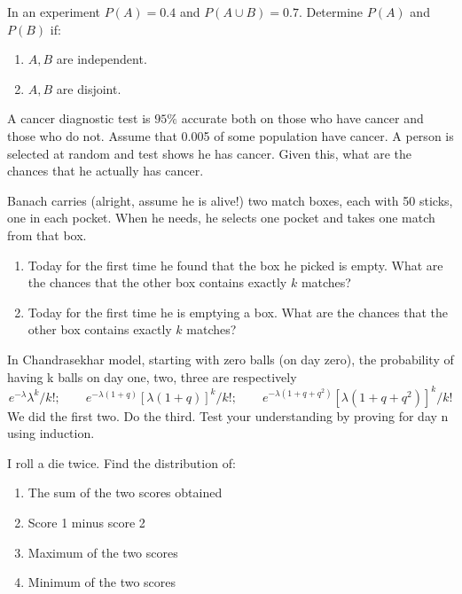 \documentclass[12pt]{article}
\newenvironment{question}[2][Question]{\begin{trivlist}
\item[\hskip \labelsep {\bfseries #1}\hskip \labelsep {\bfseries #2.}]}{\end{trivlist}}
\begin{document}
\begin{question}{16}
In an experiment $P(A) = 0.4$ and $P(A \cup B) = 0.7$. Determine $P(A)$ and $P(B)$ if:
\begin{enumerate}
\item $A, B$ are independent.
\item $A, B$ are disjoint.
\end{enumerate}
\end{question}

\begin{question}{17}
A cancer diagnostic test is $95\%$ accurate both on those who have cancer and those who do not. Assume that 0.005 of some population have cancer. A person is selected at random and test shows he has cancer. Given this, what are the chances that he actually has cancer.
\end{question}

\begin{question}{18}
Banach carries (alright, assume he is alive!) two match boxes, each with 50 sticks, one in each pocket. When he needs, he selects one pocket and takes one match from that box. 
\begin{enumerate}
\item Today for the first time he found that the box he picked is empty. What are the chances that the other box contains exactly $k$ matches? 
\item Today for the first time he is emptying a box. What are the chances that the other box contains exactly $k$ matches?
\end{enumerate}
\end{question}

\begin{question}{19}
In Chandrasekhar model, starting with zero balls (on day zero), the probability of having k balls on day one, two, three are respectively
\[ 
e^{-\lambda}\lambda^{k}/k!;\qquad e^{-\lambda(1+q)}[\lambda(1+q)]^{k}/k!;\qquad e^{-\lambda(1+q+q^2)}[\lambda(1+q+q^2)]^{k}/k! 
\]
We did the first two. Do the third. Test your understanding by proving for day n using induction.
\end{question}

\begin{question}{20}
I roll a die twice. Find the distribution of:
\begin{enumerate}
\item The sum of the two scores obtained
\item Score 1 minus score 2
\item Maximum of the two scores
\item Minimum of the two scores
\end{enumerate}
\end{question}
\end{document}
